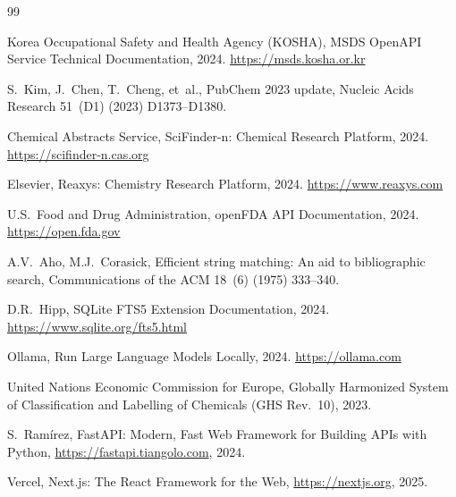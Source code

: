 \documentclass[preprint,12pt]{elsarticle}
\begin{document}
\begin{thebibliography}{99}

Korea Occupational Safety and Health Agency (KOSHA),
MSDS OpenAPI Service Technical Documentation, 2024.
\url{https://msds.kosha.or.kr}

S.~Kim, J.~Chen, T.~Cheng, et~al.,
PubChem 2023 update,
Nucleic Acids Research 51~(D1) (2023) D1373--D1380.

Chemical Abstracts Service,
SciFinder-n: Chemical Research Platform, 2024.
\url{https://scifinder-n.cas.org}

Elsevier,
Reaxys: Chemistry Research Platform, 2024.
\url{https://www.reaxys.com}

U.S.\ Food and Drug Administration,
openFDA API Documentation, 2024.
\url{https://open.fda.gov}

A.V.~Aho, M.J.~Corasick,
Efficient string matching: An aid to bibliographic search,
Communications of the ACM 18~(6) (1975) 333--340.

D.R.~Hipp,
SQLite FTS5 Extension Documentation, 2024.
\url{https://www.sqlite.org/fts5.html}

Ollama,
Run Large Language Models Locally, 2024.
\url{https://ollama.com}

United Nations Economic Commission for Europe,
Globally Harmonized System of Classification and Labelling of Chemicals (GHS Rev.~10), 2023.

S.~Ram\'{i}rez,
FastAPI: Modern, Fast Web Framework for Building APIs with Python,
\url{https://fastapi.tiangolo.com}, 2024.

Vercel,
Next.js: The React Framework for the Web,
\url{https://nextjs.org}, 2025.

\end{thebibliography}
\end{document}
